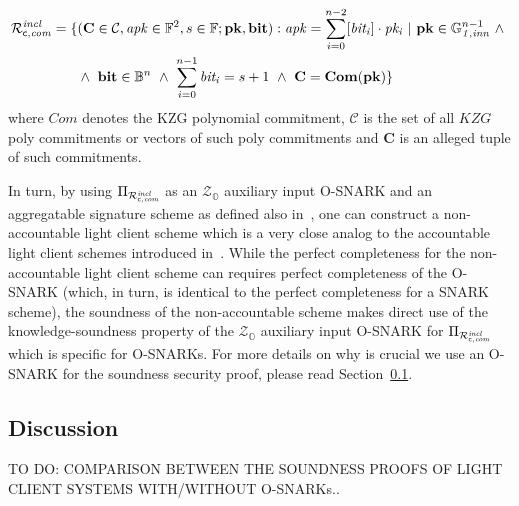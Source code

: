 \begin{align*}
 {\Rvtcom} = \{&(\mathbf{C} \in \mathcal{C}, \mathit{apk} \in \mathbb{F}^2, s \in \mathbb{F}; \mathbf{pk}, \mathbf{bit}) : 
                       \mathit{apk} = \sum_{i=0}^{n-2} [\mathit{bit_i}] \cdot \mathit{pk_i} \  | \ \mathbf{pk} \in \ginn{1}^{n-1} \ \wedge \  \\
                       & \wedge \ \mathbf{bit} \in \mathbb{B}^n \ \wedge \ \sum_{i=0}^{n-1} \mathit{bit_i} = s+1 \ \wedge \ \mathbf{C} = \mathbf{Com}(\mathbf{pk}) \} 
\end{align*}
\noindent where $\mathit{Com}$ denotes the KZG polynomial commitment, 
$\mathcal{C}$ is the set of all $\mathit{KZG}$ poly commitments or vectors of such poly commitments and $\mathbf{C}$ is an alleged tuple of such commitments.


\noindent In turn, by using $\Pi_{\mathcal{R}^{\mathit{incl}}_{\mathsf{c},\mathit{com}}}$ as an $\mathcal{Z}_{\mathbb{O}}$ auxiliary input O-SNARK and an aggregatable signature 
scheme as defined also in~\cite{LC_paper}, one can construct a non-accountable light client scheme which is a very close analog 
to the accountable light client schemes introduced in~\cite{LC_paper}. While the perfect completeness for the non-accountable light client scheme 
can requires perfect completeness of the O-SNARK (which, in turn, is identical to the perfect completeness for a SNARK scheme), 
the soundness of the non-accountable scheme makes direct use of the knowledge-soundness 
property of the $\mathcal{Z}_{\mathbb{O}}$ auxiliary input O-SNARK for $\Pi_{\mathcal{R}^{\mathit{incl}}_{\mathsf{c},\mathit{com}}}$ which is specific for O-SNARKs. 
For more details on why is crucial we use an O-SNARK for the soundness security proof, please read Section~\ref{sec:discussion}.

\subsection{Discussion}
\label{sec:discussion}

\noindent TO DO: COMPARISON BETWEEN THE SOUNDNESS PROOFS OF LIGHT CLIENT SYSTEMS WITH/WITHOUT O-SNARKs..

